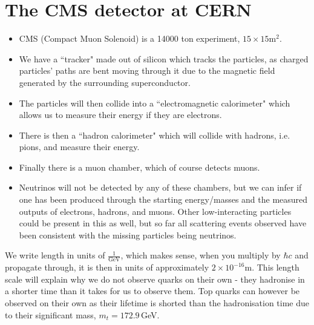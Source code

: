 \documentclass[relqm.tex]{subfiles}
\begin{document}
\section{The CMS detector at CERN}
\begin{itemize}
    \item CMS (Compact Muon Solenoid) is a 14000 ton experiment, $15\times15$m$^2$.
    \item We have a ``tracker" made out of silicon which tracks the particles, as charged particles' paths are bent moving through it due to the magnetic field generated by the surrounding superconductor.
    \item The particles will then collide into a ``electromagnetic calorimeter" which allows us to measure their energy if they are electrons. 
    \item There is then a ``hadron calorimeter" which will collide with hadrons, i.e. pions, and measure their energy. 
    \item Finally there is a muon chamber, which of course detects muons.
    \item Neutrinos will not be detected by any of these chambers, but we can infer if one has been produced through the starting energy/masses and the measured outputs of electrons, hadrons, and muons. 
        Other low-interacting particles could be present in this as well, but so far all scattering events observed have been consistent with the missing particles being neutrinos.
\end{itemize}
We write length in units of $\frac{1}{\text{GeV}}$, which makes sense, when you multiply by $\hbar c$ and propagate through, it is then in units of approximately $2\times10^{-16}$m.
This length scale will explain why we do not observe quarks on their own - they hadronise in a shorter time than it takes for us to observe them. 
Top quarks can however be observed on their own as their lifetime is shorted than the hadronisation time due to their significant mass, $m_t=172.9\,$GeV.
\end{document}
